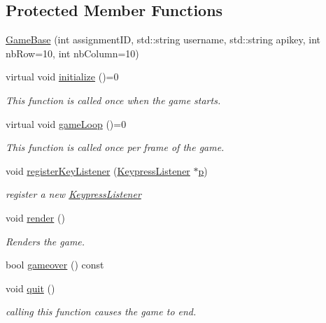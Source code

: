 \subsection*{Protected Member Functions}
\begin{DoxyCompactItemize}
\item 
\hyperlink{classbridges_1_1game_1_1_game_base_abd73825c57a10d28191a3f1162eb9bd8}{Game\+Base} (int assignment\+ID, std\+::string username, std\+::string apikey, int nb\+Row=10, int nb\+Column=10)
\item 
virtual void \hyperlink{classbridges_1_1game_1_1_game_base_a9b6eb6fa7fceaac09d204b549164037f}{initialize} ()=0
\begin{DoxyCompactList}\small\item\em This function is called once when the game starts. \end{DoxyCompactList}\item 
virtual void \hyperlink{classbridges_1_1game_1_1_game_base_a16fb787bc65be1a582cddcfba3a0c5bb}{game\+Loop} ()=0
\begin{DoxyCompactList}\small\item\em This function is called once per frame of the game. \end{DoxyCompactList}\item 
void \hyperlink{classbridges_1_1game_1_1_game_base_a9612e74fe407127cae8455a0e34b5662}{register\+Key\+Listener} (\hyperlink{classbridges_1_1game_1_1_keypress_listener}{Keypress\+Listener} $\ast$\hyperlink{namespacebridges_1_1game_ab9a19c7ab6e2ebac2f95180e21733487a83878c91171338902e0fe0fb97a8c47a}{p})
\begin{DoxyCompactList}\small\item\em register a new \hyperlink{classbridges_1_1game_1_1_keypress_listener}{Keypress\+Listener} \end{DoxyCompactList}\item 
void \hyperlink{classbridges_1_1game_1_1_game_base_ac042479b1d1cf87b8ea7c8884d5326b6}{render} ()
\begin{DoxyCompactList}\small\item\em Renders the game. \end{DoxyCompactList}\item 
bool \hyperlink{classbridges_1_1game_1_1_game_base_adbc9759ea7995f2ee224e9b85d798f2f}{gameover} () const
\item 
void \hyperlink{classbridges_1_1game_1_1_game_base_a78d8bdc86cf7c5aba6a75879be1b6140}{quit} ()
\begin{DoxyCompactList}\small\item\em calling this function causes the game to end. \end{DoxyCompactList}\item 

\end{DoxyCompactItemize}
